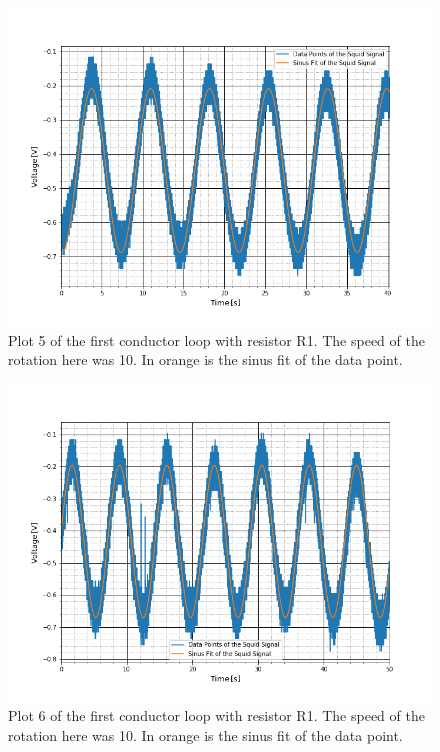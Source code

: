 \begin{figure}[ht]
	\includegraphics[scale=0.5]{Bild/r1_10_1}
	\centering
	\caption[Plot of first conductor loop 5]{Plot 5 of the first conductor loop with resistor R1. The speed of the rotation here was 10. In orange is the sinus fit of the data point.}
\end{figure}
\begin{figure}[ht]
	\includegraphics[scale=0.5]{Bild/r1_10_2}
	\centering
	\caption[Plot of first conductor loop 6]{Plot 6 of the first conductor loop with resistor R1. The speed of the rotation here was 10. In orange is the sinus fit of the data point.}
\end{figure}
